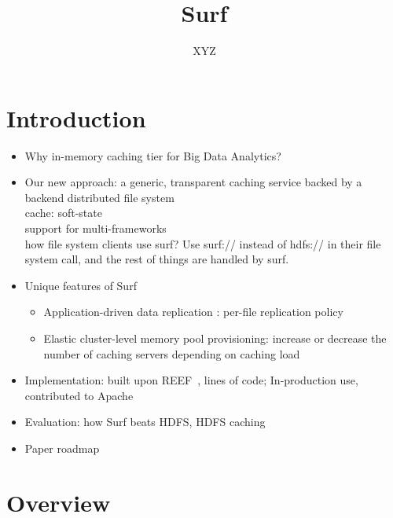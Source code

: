 \documentclass[twocolumn,10pt]{article}
\title{Surf}
\author{XYZ}
\begin{document}
\maketitle

\begin{abstract}


\end{abstract}

\section{Introduction}

\begin{itemize}
\item Why in-memory caching tier for Big Data Analytics?

\item Our new approach: a generic, transparent caching service backed by a backend distributed file system \\

cache: soft-state\\

support for multi-frameworks\\

how file system clients use surf? Use surf:// instead of hdfs:// in their file system call, and the rest of things are handled by surf.

\item Unique features of Surf
\begin{itemize}
\item Application-driven data replication : per-file replication policy
\item Elastic cluster-level memory pool provisioning: increase or decrease the number of caching servers depending on caching load
\end{itemize}

\item Implementation: built upon REEF~\cite{}, lines of code; 
In-production use, contributed to Apache

\item Evaluation: how Surf beats HDFS, HDFS caching

\item Paper roadmap

\end{itemize}


\section{Overview}
\end{document}
